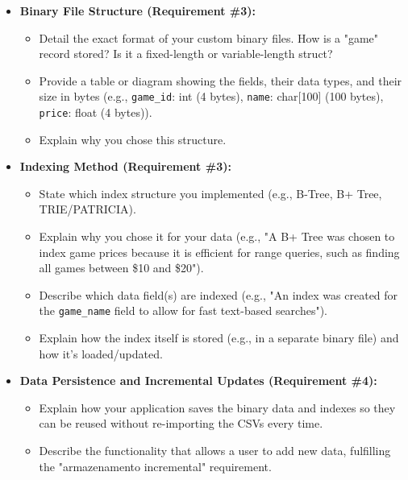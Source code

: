 \documentclass[ecp,tc]{iiufrgs}
\begin{document}
\begin{itemize}
    \item \textbf{Binary File Structure (Requirement \#3):}
    \begin{itemize}
        \item Detail the exact format of your custom binary files. How is a "game" record stored? Is it a fixed-length or variable-length struct?
        \item Provide a table or diagram showing the fields, their data types, and their size in bytes (e.g., \texttt{game\_id}: int (4 bytes), \texttt{name}: char[100] (100 bytes), \texttt{price}: float (4 bytes)).
        \item Explain why you chose this structure.
    \end{itemize}
    \item \textbf{Indexing Method (Requirement \#3):}
    \begin{itemize}
        \item State which index structure you implemented (e.g., B-Tree, B+ Tree, TRIE/PATRICIA).
        \item Explain why you chose it for your data (e.g., "A B+ Tree was chosen to index game prices because it is efficient for range queries, such as finding all games between \$10 and \$20").
        \item Describe which data field(s) are indexed (e.g., "An index was created for the \texttt{game\_name} field to allow for fast text-based searches").
        \item Explain how the index itself is stored (e.g., in a separate binary file) and how it's loaded/updated.
    \end{itemize}
    \item \textbf{Data Persistence and Incremental Updates (Requirement \#4):}
    \begin{itemize}
        \item Explain how your application saves the binary data and indexes so they can be reused without re-importing the CSVs every time.
        \item Describe the functionality that allows a user to add new data, fulfilling the "armazenamento incremental" requirement.
    \end{itemize}
\end{itemize}
\end{document}
